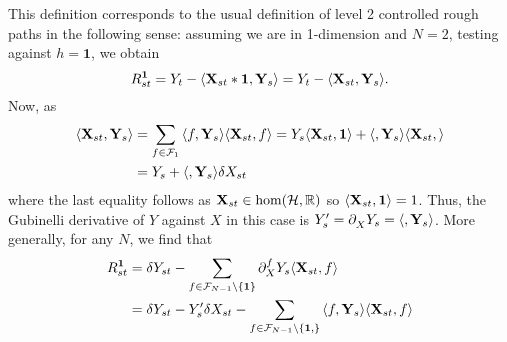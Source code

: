 \documentclass[a4paper, 10pt]{style/preprint}
\begin{document}
This definition corresponds to the usual definition of level 2 controlled rough paths in the following sense: 
assuming we are in 1-dimension and \(N = 2\), testing against \(h = \mathbf{1}\), we obtain
\[R^{\mathbf{1}}_{st} = Y_t - \< \mathbf{X}_{st} * \mathbf{1}, \mathbf{Y}_s\> 
  = Y_t - \< \mathbf{X}_{st}, \mathbf{Y}_s\>.\]
Now, as 
\begin{align*}
  \< \mathbf{X}_{st}, \mathbf{Y}_s\> 
  & = \sum_{f \in \CF_{1}} \< f, \mathbf{Y}_s\> \< \mathbf{X}_{st}, f\>
    = Y_s \< \mathbf{X}_{st}, \mathbf{1}\> 
      + \< \tree<X'>, \mathbf{Y}_s\> \< \mathbf{X}_{st}, \tree<X'>\>\\
  & = Y_s + \< \tree<X'>, \mathbf{Y}_s\> \delta X_{st}
\end{align*}
where the last equality follows as \(\mathbf{X}_{st} \in \hom({\mathcal H}, \mathbb{R})\) so 
\(\< \mathbf{X}_{st}, \mathbf{1}\> = 1\). Thus, the Gubinelli derivative of \(Y\) against 
\(X\) in this case is \(Y'_s = \partial^{\tree<X'>}_X Y_s = \< \tree<X'>, \mathbf{Y}_s\>\). 
More generally, for any \(N\), we find that
\begin{align*}
  R^{\mathbf{1}}_{st} 
  & = \delta Y_{st} - 
  \sum_{f \in \CF_{N - 1} \setminus \{\mathbf{1}\}} \partial_X^f Y_s \< \mathbf{X}_{st}, f\>\\
  & = \delta Y_{st} - Y'_s \delta X_{st} - 
    \sum_{f \in \CF_{N - 1} \setminus \{\mathbf{1}, \tree<X'>\}} \< f, \mathbf{Y}_s\> \< \mathbf{X}_{st}, f\>
\end{align*}
\end{document}
